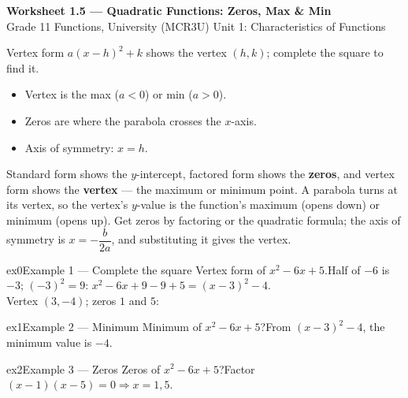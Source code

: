 \documentclass[11pt]{article}
\begin{document}
\begin{center}
{\LARGE\bfseries\color{titleblue}Worksheet 1.5 --- Quadratic Functions: Zeros, Max \& Min}\\[2pt]
{\small Grade 11 Functions, University (MCR3U) \textperiodcentered{} Unit 1: Characteristics of Functions}
\end{center}

\begin{ideabox}
Vertex form $a(x-h)^2+k$ shows the vertex $(h,k)$; complete the square to find it.
\begin{itemize}[leftmargin=*,itemsep=2pt]
  \item Vertex is the max ($a<0$) or min ($a>0$).
  \item Zeros are where the parabola crosses the $x$-axis.
  \item Axis of symmetry: $x=h$.
\end{itemize}
\end{ideabox}

\begin{learnbox}
Standard form shows the $y$-intercept, factored form shows the \textbf{zeros}, and vertex form shows the \textbf{vertex} — the maximum or minimum point.
A parabola turns at its vertex, so the vertex's $y$-value is the function's maximum (opens down) or minimum (opens up).
Get zeros by factoring or the quadratic formula; the axis of symmetry is $x=-\dfrac{b}{2a}$, and substituting it gives the vertex.
\end{learnbox}


\begin{example}{ex0}{Example 1 --- Complete the square}
Vertex form of $x^2-6x+5$.\soln Half of $-6$ is $-3$; $(-3)^2=9$: $x^2-6x+9-9+5=(x-3)^2-4$. \\ Vertex $(3,-4)$; zeros $1$ and $5$:
\end{example}

\begin{example}{ex1}{Example 2 --- Minimum}
Minimum of $x^2-6x+5$?\soln From $(x-3)^2-4$, the minimum value is $-4$.
\end{example}

\begin{example}{ex2}{Example 3 --- Zeros}
Zeros of $x^2-6x+5$?\soln Factor $(x-1)(x-5)=0\Rightarrow x=1,5$.
\end{example}
\end{document}
